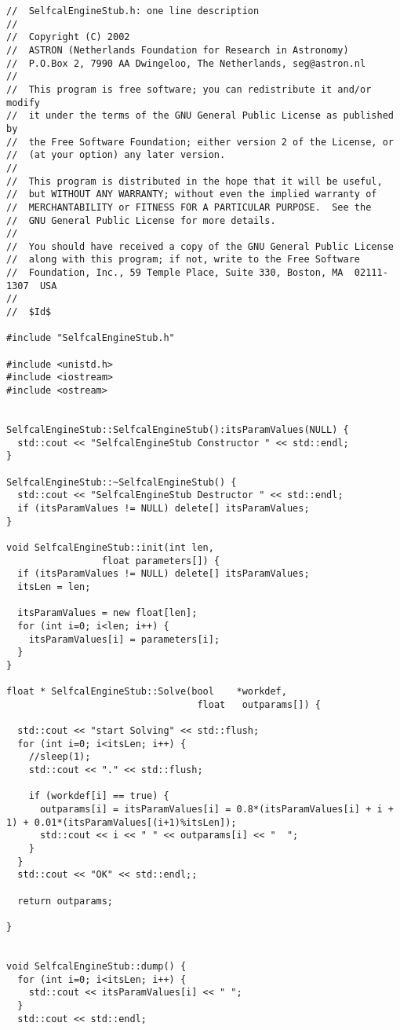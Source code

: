 \documentclass[]{lofar}
\begin{document}
\begin{Verbatim}[]
//  SelfcalEngineStub.h: one line description
//
//  Copyright (C) 2002
//  ASTRON (Netherlands Foundation for Research in Astronomy)
//  P.O.Box 2, 7990 AA Dwingeloo, The Netherlands, seg@astron.nl
//
//  This program is free software; you can redistribute it and/or modify
//  it under the terms of the GNU General Public License as published by
//  the Free Software Foundation; either version 2 of the License, or
//  (at your option) any later version.
//
//  This program is distributed in the hope that it will be useful,
//  but WITHOUT ANY WARRANTY; without even the implied warranty of
//  MERCHANTABILITY or FITNESS FOR A PARTICULAR PURPOSE.  See the
//  GNU General Public License for more details.
//
//  You should have received a copy of the GNU General Public License
//  along with this program; if not, write to the Free Software
//  Foundation, Inc., 59 Temple Place, Suite 330, Boston, MA  02111-1307  USA
//
//  $Id$

#include "SelfcalEngineStub.h"

#include <unistd.h>
#include <iostream>
#include <ostream>


SelfcalEngineStub::SelfcalEngineStub():itsParamValues(NULL) {
  std::cout << "SelfcalEngineStub Constructor " << std::endl;
}

SelfcalEngineStub::~SelfcalEngineStub() {
  std::cout << "SelfcalEngineStub Destructor " << std::endl;
  if (itsParamValues != NULL) delete[] itsParamValues;
}

void SelfcalEngineStub::init(int len,
			     float parameters[]) {
  if (itsParamValues != NULL) delete[] itsParamValues;
  itsLen = len;

  itsParamValues = new float[len];
  for (int i=0; i<len; i++) {
    itsParamValues[i] = parameters[i];
  }
}

float * SelfcalEngineStub::Solve(bool    *workdef, 
                                  float   outparams[]) {

  std::cout << "start Solving" << std::flush;
  for (int i=0; i<itsLen; i++) {
    //sleep(1);
    std::cout << "." << std::flush;

    if (workdef[i] == true) {
      outparams[i] = itsParamValues[i] = 0.8*(itsParamValues[i] + i + 1) + 0.01*(itsParamValues[(i+1)%itsLen]);
      std::cout << i << " " << outparams[i] << "  ";
    }
  }
  std::cout << "OK" << std::endl;;
  
  return outparams;
  
}


void SelfcalEngineStub::dump() {
  for (int i=0; i<itsLen; i++) {
    std::cout << itsParamValues[i] << " ";
  }
  std::cout << std::endl;
\end{Verbatim}
\end{document}
